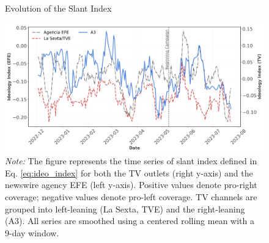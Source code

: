 \documentclass[12pt]{article}
\begin{document}


\begin{figure}[!htb]
	\caption{Evolution of the Slant Index}
	\centering
	\includegraphics[width=150mm]{figures/tv_vs_efe_net_diff}
	\caption*{\small \textit{Note:} The figure represents the time series of slant index defined in Eq. \eqref{eq:ideo_index} for both the  TV outlets (right y-axis) and the newswire agency EFE (left y-axis). Positive values denote pro-right coverage; negative values denote pro-left coverage. TV channels are grouped into left-leaning (La Sexta, TVE) and the right-leaning (A3). All series are smoothed using a centered rolling mean with a 9-day window.}
	\label{fig:net_tone}
\end{figure}

\end{document}

